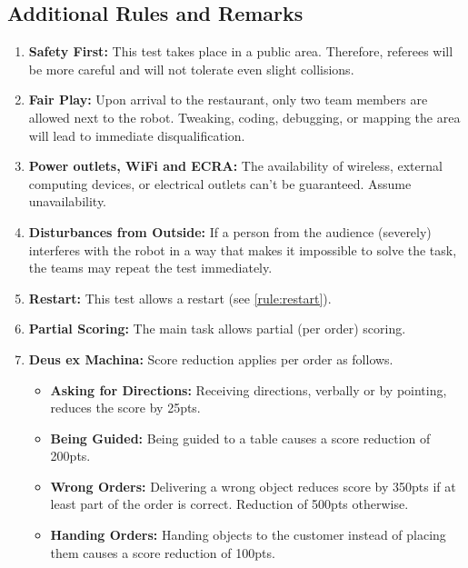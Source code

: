 \subsection*{Additional Rules and Remarks}
\begin{enumerate}[nosep]
	\item \textbf{Safety First:} This test takes place in a public area. Therefore, referees will be more careful and will not tolerate even slight collisions.
	
	\item \textbf{Fair Play:} Upon arrival to the restaurant, only two team members are allowed next to the robot. Tweaking, coding, debugging, or mapping the area will lead to immediate disqualification.
	
	\item \textbf{Power outlets, WiFi and ECRA:} The availability of wireless, external computing devices, or electrical outlets can't be guaranteed. Assume unavailability.
	
	\item \textbf{Disturbances from Outside:} If a person from the audience (severely) interferes with the robot in a way that makes it impossible to solve the task, the teams may repeat the test immediately.
	
	\item \textbf{Restart:} This test allows a restart (see \ref{rule:restart}).
	
	\item \textbf{Partial Scoring:} The main task allows partial (per order) scoring.
	
	\item \textbf{Deus ex Machina:} Score reduction applies per order as follows.
	\begin{itemize}[nosep]
		\item\textbf{Asking for Directions:} Receiving directions, verbally or by pointing, reduces the score by 25pts.
		\item\textbf{Being Guided:} Being guided to a table causes a score reduction of 200pts.
		\item\textbf{Wrong Orders:} Delivering a wrong object reduces score by 350pts if at least part of the order is correct. Reduction of 500pts otherwise.
		\item\textbf{Handing Orders:} Handing objects to the customer instead of placing them causes a score reduction of 100pts.
	\end{itemize}


\end{enumerate}


